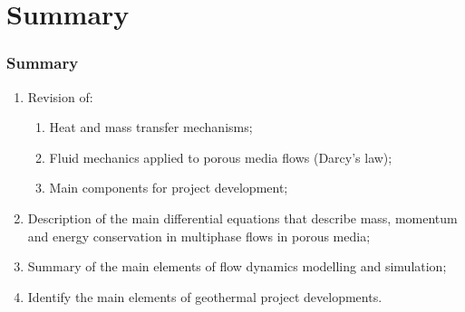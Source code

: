 \documentclass[10pt,compress,unknownkeysallowed]{beamer}
\begin{document}
\section{Summary}
\begin{frame}
 \frametitle{Summary}
  \begin{enumerate}[1.]
%
     \item <1-> Revision of:
         \begin{enumerate}[{1.}a)]
             \item <1-> Heat and mass transfer mechanisms;
             \item <1-> Fluid mechanics applied to porous media flows (Darcy's law);
             \item <1-> Main components for project development;
         \end{enumerate}
     \item <2-> Description of the main differential equations that describe mass, momentum and energy conservation in multiphase flows in porous media;
     \item <3-> Summary of the main elements of flow dynamics modelling and simulation;
     \item <4-> Identify the main elements of geothermal project developments.
%
  \end{enumerate}
\end{frame}
\end{document}

